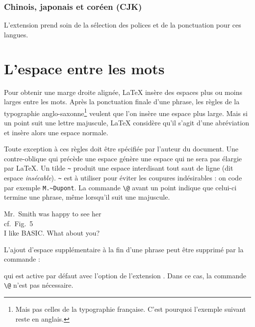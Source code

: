 \subsubsection{Chinois, japonais et coréen (CJK)}

L'extension \cite{xecjk} prend soin de la sélection des
polices et de la ponctuation pour ces langues.

\section{L'espace entre les mots}

Pour obtenir une marge droite alignée, \LaTeX{} insère des espaces
plus ou moins larges entre les mots. Après la ponctuation finale
d'une phrase, les règles de la typographie anglo-saxonne\footnote{Mais pas
  celles de la typographie française. C'est pourquoi l'exemple suivant reste
  en anglais. \NdT} veulent que
l'on insère une espace plus large.  Mais si un point suit une lettre
majuscule, \LaTeX{} considère qu'il s'agit d'une abréviation et insère
alors une espace normale.

Toute exception à ces règles doit être spécifiée par l'auteur du
document. Une contre-oblique qui précède une espace génère une espace qui ne
sera pas élargie par \LaTeX{}.  Un tilde \og \verb|~| \fg{} produit
une espace interdisant tout saut de ligne (dit espace
\emph{insécable}).  \verb|~| est à utiliser pour éviter les coupures
indésirables : on code par exemple \verb|M.~Dupont|.  La
commande \verb|\@| avant un point indique que celui-ci termine une
phrase, même lorsqu'il suit une majuscule.
 

\begin{otherlanguage}{english}
\begin{example}
  Mr.~Smith was happy to see her\\
  cf.~Fig.~5\\
  I like BASIC\@. What about you?
\end{example}
\end{otherlanguage}

L'ajout d'espace supplémentaire à la fin d'une phrase peut être
supprimé par la commande :
\begin{lscommand}
\end{lscommand}
\noindent qui est active par défaut avec l'option  de
l'extension . Dans ce cas, la commande \verb|\@| n'est pas
nécessaire.



